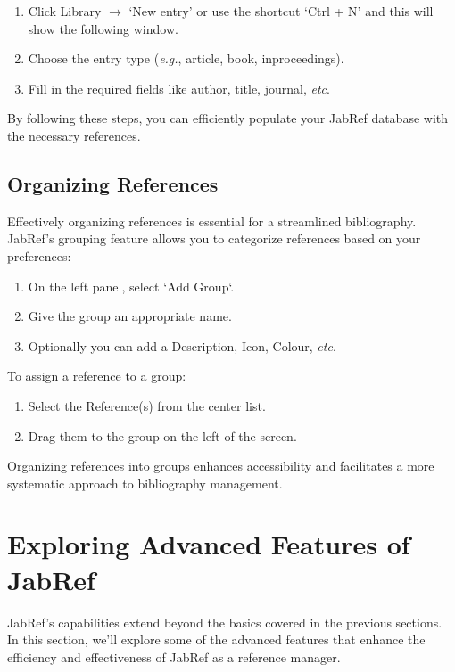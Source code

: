 				\begin{enumerate}
					\item Click Library $\rightarrow$ `New entry' or use the shortcut `Ctrl + N' and this will show the following window.\\
						\begin{Center}\texttt{[image: \\insertimage\{JabRef\_New\_Entry.png]}}\end{Center}
					\item Choose the entry type (\textit{e.g.}, article, book, inproceedings).
					\item Fill in the required fields like author, title, journal, \textit{etc}.
				\end{enumerate}
				
				By following these steps, you can efficiently populate your JabRef database with the necessary references.

		\subsection{Organizing References}
			Effectively organizing references is essential for a streamlined bibliography. 
			JabRef's grouping feature allows you to categorize references based on your preferences:
			\begin{enumerate}
				\item On the left panel, select `Add Group`.
				\item Give the group an appropriate name.
				\item Optionally you can add a Description, Icon, Colour, \textit{etc}.
			\end{enumerate}
			
			To assign a reference to a group:
			\begin{enumerate}
				\item Select the Reference(s) from the center list.
				\item Drag them to the group on the left of the screen.
			\end{enumerate}
			Organizing references into groups enhances accessibility and facilitates a more systematic approach to bibliography management.

	\section{Exploring Advanced Features of JabRef}
		JabRef's capabilities extend beyond the basics covered in the previous sections. 
		In this section, we'll explore some of the advanced features that enhance the efficiency and effectiveness of JabRef as a reference manager.

